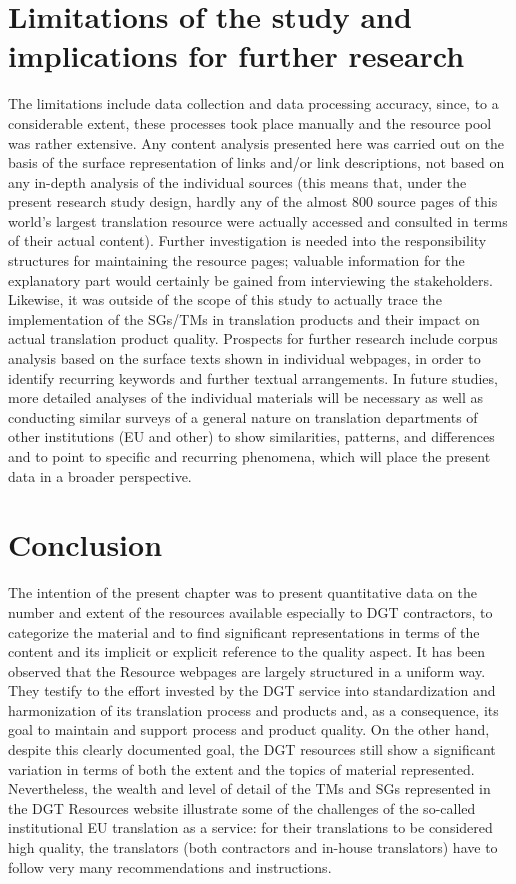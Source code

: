 \documentclass[output=paper]{langsci/langscibook}
\begin{document}
\section{Limitations of the study and implications for further research}\label{sec:svoboda:6}

The limitations include data collection and data processing accuracy, since, to a considerable extent, these processes took place manually and the resource pool was rather extensive. Any content analysis presented here was carried out on the basis of the surface representation of links and/or link descriptions, not based on any in-depth analysis of the individual sources (this means that, under the present research study design, hardly any of the almost 800 source pages of this world’s largest translation resource were actually accessed and consulted in terms of their actual content). Further investigation is needed into the responsibility structures for maintaining the resource pages; valuable information for the explanatory part would certainly be gained from interviewing the stakeholders. Likewise, it was outside of the scope of this study to actually trace the implementation of the SGs/TMs in translation products and their impact on actual translation product quality. Prospects for further research include corpus analysis based on the surface texts shown in individual webpages, in order to identify recurring keywords and further textual arrangements. In future studies, more detailed analyses of the individual materials will be necessary as well as conducting similar surveys of a general nature on translation departments of other institutions (EU and other) to show similarities, patterns, and differences and to point to specific and recurring phenomena, which will place the present data in a broader perspective.

\section{Conclusion}\label{sec:svoboda:7}

The intention of the present chapter was to present quantitative data on the number and extent of the resources available especially to DGT contractors, to categorize the material and to find significant representations in terms of the content and its implicit or explicit reference to the quality aspect. It has been observed that the Resource webpages are largely structured in a uniform way. They testify to the effort invested by the DGT service into standardization and harmonization of its translation process and products and, as a consequence, its goal to maintain and support process and product quality. On the other hand, despite this clearly documented goal, the DGT resources still show a significant variation in terms of both the extent and the topics of material represented. Nevertheless, the wealth and level of detail of the TMs and SGs represented in the DGT Resources website illustrate some of the challenges of the so-called institutional EU translation as a service: for their translations to be considered high quality, the translators (both contractors and in-house translators) have to follow very many recommendations and instructions.
\end{document}
